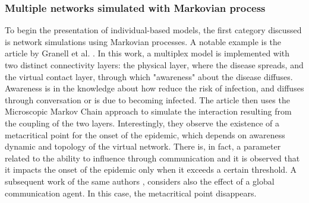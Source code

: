 \subsubsection{Multiple networks simulated with Markovian process}
To begin the presentation of individual-based models, the first category discussed is network simulations using Markovian processes. A notable example is the article by Granell et al. \cite{Granell_2014}. In this work, a multiplex model is implemented with two distinct connectivity layers: the physical layer, where the disease spreads, and the virtual contact layer, through which "awareness" about the disease diffuses. Awareness is in the knowledge about how reduce the risk of infection, and diffuses through conversation or is due to becoming infected. The article then uses the Microscopic Markov Chain approach to simulate the interaction resulting from the coupling of the two layers. Interestingly, they observe the existence of a metacritical point for the onset of the epidemic, which depends on awareness dynamic and topology of the virtual network. There is, in fact, a parameter related to the ability to influence through communication and it is observed that it impacts the onset of the epidemic only when it exceeds a certain threshold.
A subsequent work of the same authors \cite{Granell2013}, considers also the effect of a global communication agent. In this case, the metacritical point disappears. 
